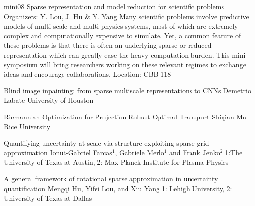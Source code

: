 \mini
{mini08}
{Sparse representation and model reduction for scientific problems}
{Organizers: Y. Lou, J. Hu \& Y. Yang}
{Many scientific problems involve predictive models of multi-scale and multi-physics systems, most of which are extremely complex and computationally expensive to simulate. Yet, a common feature of these problems is that there is often an underlying sparse or reduced representation which can greatly ease the heavy computation burden. This mini-symposium will bring researchers working on these relevant regimes to exchange ideas and encourage collaborations.}
{Location: CBB 118}

\begin{talks}
\item\talk
{Blind image inpainting: from sparse multiscale representations to CNNs}
{Demetrio Labate}
{University of Houston}
\item\talk
{Riemannian Optimization for Projection Robust Optimal Transport}
{Shiqian Ma}
{Rice University}
\item\talk
{Quantifying uncertainty at scale via structure-exploiting sparse grid approximation}
{Ionut-Gabriel Farcas$^{1}$, Gabriele Merlo$^{1}$ and Frank Jenko$^{2}$}
{1:The University of Texas at Austin, 2: Max Planck Institute for Plasma Physics}\item\talk
{A general framework of rotational sparse approximation in uncertainty quantification}
{Mengqi Hu, Yifei Lou, and Xiu Yang}
{1: Lehigh University, 2: University of Texas at Dallas}
\end{talks}
\room
